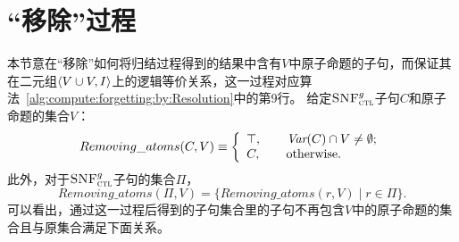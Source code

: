 \section{“移除”过程}
\label{sec:remV}
本节意在“移除”如何将归结过程得到的结果中含有$V$中原子命题的子句，而保证其在二元组${\langle{V\cup V, I}\rangle}$上的逻辑等价关系，这一过程对应算法~\ref{alg:compute:forgetting:by:Resolution}中的第9行。
给定${\textsc{SNF}_{\textsc{ctl}}^g}$子句$C$和原子命题的集合$V$：
\[Removing\_atoms(C, V) \equiv
\left\{
\begin{array}{ll}
	\top, \qquad \hbox{$\textit{Var}(C) \cap V \not = \emptyset$;} \\
	C,  \qquad  \hbox{otherwise.}
\end{array}
\right.
\]
此外，对于${\textsc{SNF}_{\textsc{ctl}}^g}$子句的集合$\Pi$，
\[Removing\_atoms(\Pi, V) = \{Removing\_atoms(r, V) \mid r \in \Pi\}.\]
可以看出，通过这一过程后得到的子句集合里的子句不再包含$V$中的原子命题的集合且与原集合满足下面关系。

